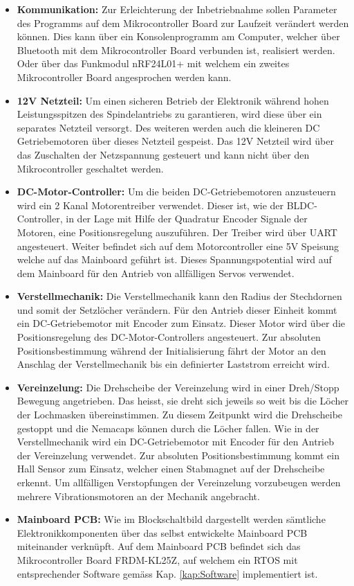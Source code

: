\begin{itemize}
	\item \textbf{Kommunikation:} Zur Erleichterung der Inbetriebnahme sollen Parameter des Programms auf dem Mikrocontroller Board zur Laufzeit verändert werden können. Dies kann über ein Konsolenprogramm am Computer, welcher über Bluetooth mit dem Mikrocontroller Board verbunden ist, realisiert werden. Oder über das Funkmodul nRF24L01+ mit welchem ein zweites Mikrocontroller Board angesprochen werden kann.
			
	\item \textbf{12V Netzteil:} Um einen sicheren Betrieb der Elektronik während hohen Leistungsspitzen des Spindelantriebs zu garantieren, wird diese über ein separates Netzteil versorgt. Des weiteren werden auch die kleineren DC Getriebemotoren über dieses Netzteil gespeist. Das 12V Netzteil wird über das Zuschalten der Netzspannung gesteuert und kann nicht über den Mikrocontroller geschaltet werden.
	
	\item \textbf{DC-Motor-Controller:} Um die beiden DC-Getriebemotoren anzusteuern wird ein 2 Kanal Motorentreiber verwendet. Dieser ist, wie der BLDC-Controller, in der Lage mit Hilfe der Quadratur Encoder Signale der Motoren, eine Positionsregelung auszuführen. Der Treiber wird über UART angesteuert. Weiter befindet sich auf dem Motorcontroller eine 5V Speisung welche auf das Mainboard geführt ist. Dieses Spannungspotential wird auf dem Mainboard für den Antrieb von allfälligen Servos verwendet.
	
	\item \textbf{Verstellmechanik:} Die Verstellmechanik kann den Radius der Stechdornen und somit der Setzlöcher verändern. Für den Antrieb dieser Einheit kommt ein DC-Getriebemotor mit Encoder zum Einsatz. Dieser Motor wird über die Positionsregelung des DC-Motor-Controllers angesteuert. Zur absoluten Positionsbestimmung während der Initialisierung fährt der Motor an den Anschlag der Verstellmechanik bis ein definierter Laststrom erreicht wird.
	
	\item \textbf{Vereinzelung:} Die Drehscheibe der Vereinzelung wird in einer Dreh/Stopp Bewegung angetrieben. Das heisst, sie dreht sich jeweils so weit bis die Löcher der Lochmasken übereinstimmen. Zu diesem Zeitpunkt wird die Drehscheibe gestoppt und die Nemacaps können durch die Löcher fallen. Wie in der Verstellmechanik wird ein DC-Getriebemotor mit Encoder für den Antrieb der Vereinzelung verwendet. Zur absoluten Positionsbestimmung kommt ein Hall Sensor zum Einsatz, welcher einen Stabmagnet auf der Drehscheibe erkennt. Um allfälligen Verstopfungen der Vereinzelung vorzubeugen werden mehrere Vibrationsmotoren an der Mechanik angebracht.
	
	\item \textbf{Mainboard PCB:} Wie im Blockschaltbild dargestellt werden sämtliche Elektronikkomponenten über das selbst entwickelte Mainboard PCB miteinander verknüpft. Auf dem Mainboard PCB befindet sich das Mikrocontroller Board FRDM-KL25Z, auf welchem ein RTOS mit entsprechender Software gemäss Kap. \ref{kap:Software} implementiert ist.
\end{itemize}
